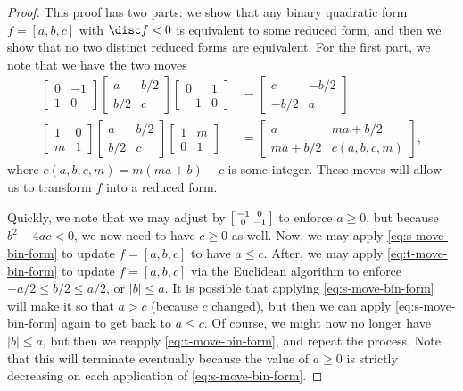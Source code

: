 \documentclass[../notes.tex]{subfiles}
\begin{document}
\begin{proof}
	This proof has two parts: we show that any binary quadratic form $f=[a,b,c]$ with $\disc f<0$ is equivalent to some reduced form, and then we show that no two distinct reduced forms are equivalent. For the first part, we note that we have the two moves
	\begin{align}
		\begin{bmatrix}
			0 & -1 \\
			1 & 0
		\end{bmatrix}\begin{bmatrix}
			a & b/2 \\
			b/2 & c
		\end{bmatrix}\begin{bmatrix}
			0 & 1 \\
			-1 & 0
		\end{bmatrix}&=\begin{bmatrix}
			c & -b/2 \\
			-b/2 & a
		\end{bmatrix} \label{eq:s-move-bin-form} \\
		\begin{bmatrix}
			1 & 0 \\
			m & 1
		\end{bmatrix}\begin{bmatrix}
			a & b/2 \\
			b/2 & c
		\end{bmatrix}\begin{bmatrix}
			1 & m \\
			0 & 1
		\end{bmatrix}&=\begin{bmatrix}
			a & ma+b/2 \\
			ma+b/2 & c(a,b,c,m)
		\end{bmatrix}, \label{eq:t-move-bin-form}
	\end{align}
	where $c(a,b,c,m)=m(ma+b)+c$ is some integer. These moves will allow us to transform $f$ into a reduced form.
	
	Quickly, we note that we may adjust by $\begin{bsmallmatrix}
		-1 & 0 \\ 0 & -1
	\end{bsmallmatrix}$ to enforce $a\ge0$, but because $b^2-4ac<0$, we now need to have $c\ge0$ as well. Now, we may apply \eqref{eq:s-move-bin-form} to update $f=[a,b,c]$ to have $a\le c$. After, we may apply \eqref{eq:t-move-bin-form} to update $f=[a,b,c]$ via the Euclidean algorithm to enforce $-a/2\le b/2\le a/2$, or $\left|b\right|\le a$. It is possible that applying \eqref{eq:s-move-bin-form} will make it so that $a>c$ (because $c$ changed), but then we can apply \eqref{eq:s-move-bin-form} again to get back to $a\le c$. Of course, we might now no longer have $\left|b\right|\le a$, but then we reapply \eqref{eq:t-move-bin-form}, and repeat the process. Note that this will terminate eventually because the value of $a\ge0$ is strictly decreasing on each application of \eqref{eq:s-move-bin-form}.
	

\end{proof}
\end{document}
